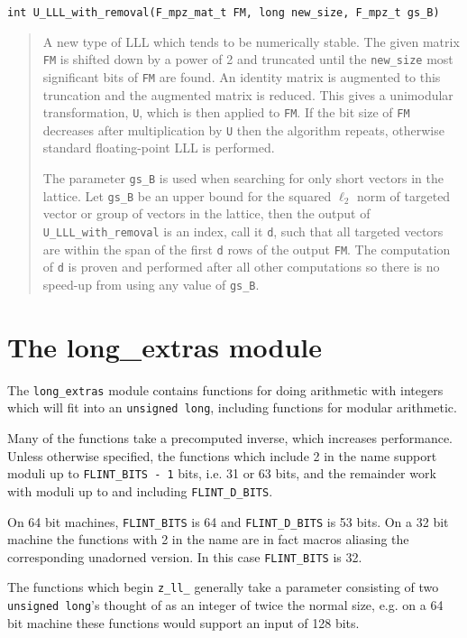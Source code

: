 \documentclass[a4paper,10pt]{article}
\newcommand{\code}{\lstinline}
\begin{document}
\begin{lstlisting}
int U_LLL_with_removal(F_mpz_mat_t FM, long new_size, F_mpz_t gs_B)
\end{lstlisting}

\begin{quote}
A new type of LLL which tends to be numerically stable.  The given matrix \code{FM} is shifted down by a power of 2
and truncated until the \code{new_size} most significant bits of \code{FM} are found.  An identity matrix is augmented to this 
truncation and the augmented matrix is reduced.  This gives a unimodular transformation, \code{U}, which is then applied to 
\code{FM}.  If the bit size of \code{FM} decreases after multiplication by \code{U} then the algorithm repeats, 
otherwise standard floating-point LLL is performed.

The parameter \code{gs_B} is used when searching for only short vectors in the lattice.  Let \code{gs_B} be an upper bound for 
the squared $\ell_2$ norm of targeted vector or group of vectors in the lattice, then the output of \code{U_LLL_with_removal} is 
an index, call it \code{d}, such that all targeted vectors are within the span of the first \code{d} rows of the output \code{FM}.  
The computation of \code{d} is proven and performed after all other computations so there is no speed-up from using any value 
of \code{gs_B}.
\end{quote}


\section{The long\_extras module}
The \code{long_extras} module contains functions for doing arithmetic with integers which will fit into an \code{unsigned long}, including functions for modular arithmetic.

Many of the functions take a precomputed inverse, which increases performance. Unless otherwise specified, the functions which include 2 in the name support moduli up to \code{FLINT_BITS - 1} bits, i.e. 31 or 63 bits, and the remainder work with moduli up to and including \code{FLINT_D_BITS}. 

On 64 bit machines, \code{FLINT_BITS} is 64 and \code{FLINT_D_BITS} is 53 bits. On a 32 bit machine the functions with 2 in the name are in fact macros aliasing the corresponding unadorned version. In this case \code{FLINT_BITS} is 32.

The functions which begin \code{z_ll_} generally take a parameter consisting of two \code{unsigned long}'s thought of as an integer of twice the normal size, e.g. on a 64 bit machine these functions would support an input of 128 bits.
\end{document}
